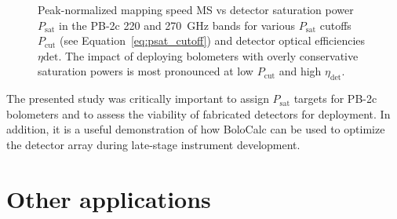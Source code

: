 \begin{figure}[!t]
    \centering
    \caption{Peak-normalized mapping speed MS vs detector saturation power $P_{\mathrm{sat}}$ in the PB-2c 220 and 270~GHz bands for various $P_{\mathrm{sat}}$ cutoffs $P_{\mathrm{cut}}$ (see Equation~\ref{eq:psat_cutoff}) and detector optical efficiencies $\eta{\mathrm{det}}$. The impact of deploying bolometers with overly conservative saturation powers is most pronounced at low $P_{\mathrm{cut}}$ and high $\eta_{\mathrm{det}}$.}
    \label{fig:pb2c_psat_ms_obsEff}
\end{figure}

The presented study was critically important to assign $P_{\mathrm{sat}}$ targets for PB-2c bolometers and to assess the viability of fabricated detectors for deployment. In addition, it is a useful demonstration of how BoloCalc can be used to optimize the detector array during late-stage instrument development.


\section{Other applications}
\label{sec:bolocal_other_applications}

